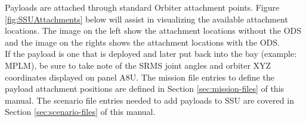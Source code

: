 \documentclass[13pt]{article}
\begin{document}
\begin{multicols*}{2}
Payloads are attached through standard Orbiter attachment points. Figure \ref{fig:SSUAttachments} below will assist in visualizing the available attachment locations. The image on the left show the attachment locations without the ODS and the image on the rights shows the attachment locations with the ODS.\\
If the payload is one that is deployed and later put back into the bay (example: MPLM), be sure to take note of the SRMS joint angles and orbiter XYZ coordinates displayed on panel A8U.
The mission file entries to define the payload attachment positions are defined in Section \ref{sec:mission-files} of this manual.
The scenario file entries needed to add payloads to SSU are covered in Section \ref{sec:scenario-files} of this manual. \\

\newpage

\end{multicols*}
\end{document}
